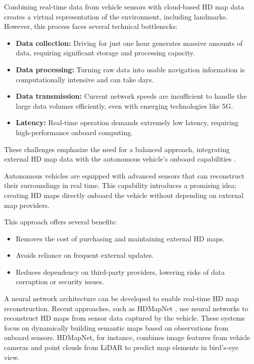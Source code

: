 Combining real-time data from vehicle sensors with cloud-based HD map data creates a virtual representation of the environment, including landmarks. However, this process faces several technical bottlenecks:
\begin{itemize}
    \item \textbf{Data collection:} Driving for just one hour generates massive amounts of data, requiring significant storage and processing capacity.
    \item \textbf{Data processing:} Turning raw data into usable navigation information is computationally intensive and can take days.
    \item \textbf{Data transmission:} Current network speeds are insufficient to handle the large data volumes efficiently, even with emerging technologies like 5G.
    \item \textbf{Latency:} Real-time operation demands extremely low latency, requiring high-performance onboard computing.
\end{itemize}

These challenges emphasize the need for a balanced approach, integrating external HD map data with the autonomous vehicle's onboard capabilities \cite{SEIF2016159, bao2022highdefinitionmapgenerationtechnologies}.

Autonomous vehicles are equipped with advanced sensors that can reconstruct their surroundings in real time. This capability introduces a promising idea: creating HD maps directly onboard the vehicle without depending on external map providers.

This approach offers several benefits:
\begin{itemize}
    \item Removes the cost of purchasing and maintaining external HD maps.
    \item Avoids reliance on frequent external updates.
    \item Reduces dependency on third-party providers, lowering risks of data corruption or security issues.
\end{itemize}

A neural network architecture can be developed to enable real-time HD map reconstruction. Recent approaches, such as HDMapNet \cite{li2022hdmapnetonlinehdmap}, use neural networks to reconstruct HD maps from sensor data captured by the vehicle. These systems focus on dynamically building semantic maps based on observations from onboard sensors. HDMapNet, for instance, combines image features from vehicle cameras and point clouds from LiDAR to predict map elements in bird's-eye view.

